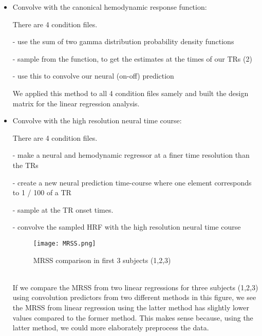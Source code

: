 \begin{itemize}
\item Convolve with the canonical hemodynamic response function:\\
\par There are 4 condition files.\\
\par - use the sum of two gamma distribution probability density functions\\
\par - sample from the function, to get the estimates at the times of our TRs (2)\\
\par - use this to convolve our neural (on-off) prediction\\
\par We applied this method to all 4 condition files samely and built the design matrix for the linear regression analysis. \\


\item Convolve with the high resolution neural time course:\\
\par There are 4 condition files.\\
\par - make a neural and hemodynamic regressor at a finer time resolution than the TRs\\
\par - create a new neural prediction time-course where one element corresponds to 1 / 100 of a TR\\
\par - sample at the TR onset times.
\par - convolve the sampled HRF with the high resolution neural time course\\

\begin{figure}[H]
    \centering
        \texttt{[image: MRSS.png]}
    \caption{MRSS comparison in first 3 subjects (1,2,3)}
\end{figure}

\\
If we compare the MRSS from two linear regressions for three subjects (1,2,3) using convolution predictors from two different methods in this figure, we see the MRSS from linear regression using the latter method has slightly lower values compared to the former method. This makes sense because, using the latter method, we could more elaborately preprocess the data.
\end {itemize}
